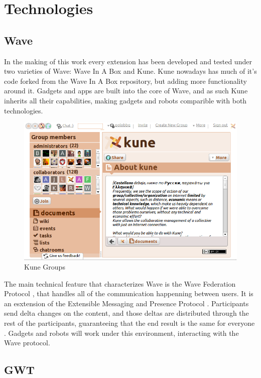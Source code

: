 \newpage
\section{Technologies}

\subsection{Wave}

In the making of this work every extension has been developed and tested under two varieties of Wave: Wave In A Box and Kune. Kune nowadays has much of it's code forked from the Wave In A Box repository, but adding more functionality around it. Gadgets and apps are built into the core of Wave, and as such Kune inherits all their capabilities, making gadgets and robots comparible with both technologies.\\[.2cm]
\begin{figure}[h]
  \center
    \includegraphics[keepaspectratio, scale=0.4]{Media/Captures/Wave/Kune_Groups.png}
  \caption{Kune Groups}
  \label{fig:kune_groups}
\end{figure}
The main technical feature that characterizes Wave is the Wave Federation Protocol \cite{ref:wave_federated_protocol}, that handles all of the communication happenning between users. It is an esxtension of the Extensible Messaging and Presence Protocol \cite{ref:xmpp}. Participants send delta changes on the content, and those deltas are distributed through the rest of the participants, guaranteeing that the end result is the same for everyone \cite{ref:federating_websites_google_wave}. Gadgets and robots will work under this environment, interacting with the Wave protocol.


\subsection{GWT}

